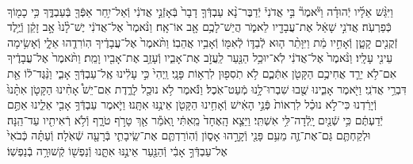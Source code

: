 \documentclass[twoside, openany, parskip=half, 11pt]{book}
\begin{document}
\begin{sometimes}
\begin{footnotesize}
\begin{multicols}{2}
\\
וַיִּגַּ֨שׁ אֵלָ֜יו יְֿהוּדָ֗ה וַיֹּ֘אמֶר֘ בִּ֣י אֲדֹנִי֒ יְֿדַבֶּר־נָ֨א עַבְדְּֿךָ֤ דָבָר֙ בְּֿאָזְֿנֵ֣י אֲדֹנִ֔י וְֿאַל־יִ֥חַר אַפְּֿךָ֖ בְּֿעַבְדֶּ֑ךָ כִּ֥י כָמ֖וֹךָ כְּֿפַרְעֹֽה׃ אֲדֹנִ֣י שָׁאַ֔ל אֶת־עֲבָדָ֖יו לֵאמֹ֑ר הֲיֵשׁ־לָכֶ֥ם אָ֖ב אוֹ־אָֽח׃ וַנֹּ֨אמֶר֙ אֶל־אֲדֹנִ֔י יֶשׁ־לָ֨נוּ֙ אָ֣ב זָקֵ֔ן וְֿיֶ֥לֶד זְֿקֻנִ֖ים קָטָ֑ן וְֿאָחִ֣יו מֵ֔ת וַיִּוָּתֵ֨ר ה֧וּא לְֿבַדּ֛וֹ לְֿאִמּ֖וֹ וְֿאָבִ֥יו אֲהֵבֽוֹ׃  וַתֹּ֨אמֶר֙ אֶל־עֲבָדֶ֔יךָ הֽוֹרִדֻ֖הוּ אֵלָ֑י וְֿאָשִׂ֥ימָה עֵינִ֖י עָלָֽיו׃ וַנֹּ֨אמֶר֙ אֶל־אֲדֹנִ֔י לֹֽא־יוּכַ֥ל הַנַּ֖עַר לַֽעֲזֹ֣ב אֶת־אָבִ֑יו וְֿעָזַ֥ב אֶת־אָבִ֖יו וָמֵֽת׃ וַתֹּ֨אמֶר֙ אֶל־עֲבָדֶ֔יךָ אִם־לֹ֥א יֵרֵ֛ד אֲחִיכֶ֥ם הַקָּטֹ֖ן אִתְּֿכֶ֑ם לֹ֥א תֹֽסִפ֖וּן לִרְא֥וֹת פָּנָֽי׃ וַֽיְהִי֙ כִּ֣י עָלִ֔ינוּ אֶֽל־עַבְדְּֿךָ֖ אָבִ֑י וַנַּ֨גֶּד־ל֔וֹ אֵ֖ת דִּבְרֵ֥י אֲדֹנִֽי׃  וַיֹּ֖אמֶר אָבִ֑ינוּ שֻׁ֖בוּ שִׁבְרוּ־לָ֥נוּ מְֿעַט־אֹֽכֶל׃ וַנֹּ֕אמֶר לֹ֥א נוּכַ֖ל לָרֶ֑דֶת אִם־יֵשׁ֩ אָחִ֨ינוּ הַקָּטֹ֤ן אִתָּ֨נוּ֙ וְֿיָרַ֔דְנוּ כִּי־לֹ֣א נוּכַ֗ל לִרְאוֹת֙ פְּֿנֵ֣י הָאִ֔ישׁ וְֿאָחִ֥ינוּ הַקָּטֹ֖ן אֵינֶ֥נּוּ אִתָּֽנוּ׃ וַיֹּ֛אמֶר עַבְדְּֿךָ֥ אָבִ֖י אֵלֵ֑ינוּ אַתֶּ֣ם יְֿדַעְתֶּ֔ם כִּ֥י שְֿׁנַ֖יִם יָֽלְֿדָה־לִּ֥י אִשְׁתִּֽי׃ וַיֵּצֵ֤א הָֽאֶחָד֙ מֵֽאִתִּ֔י וָֽאֹמַ֕ר אַ֖ךְ טָרֹ֣ף טֹרָ֑ף וְֿלֹ֥א רְֿאִיתִ֖יו עַד־הֵֽנָּה׃ וּלְקַחְתֶּ֧ם גַּם־אֶת־זֶ֛ה מֵעִ֥ם פָּנַ֖י וְֿקָרָ֣הוּ אָס֑וֹן וְֿהֽוֹרַדְתֶּ֧ם אֶת־שֵֽׂיבָתִ֛י בְּֿרָעָ֖ה שְֿׁאֹֽלָה׃ וְֿעַתָּ֗ה כְּֿבֹאִי֙ אֶל־עַבְדְּֿךָ֣ אָבִ֔י וְֿהַנַּ֖עַר אֵינֶ֣נּוּ אִתָּ֑נוּ וְֿנַפְשׁ֖וֹ קְֿשׁוּרָ֥ה בְֿנַפְשֽׁוֹ׃


\end{multicols}
\end{footnotesize}
\end{sometimes}
\end{document}
